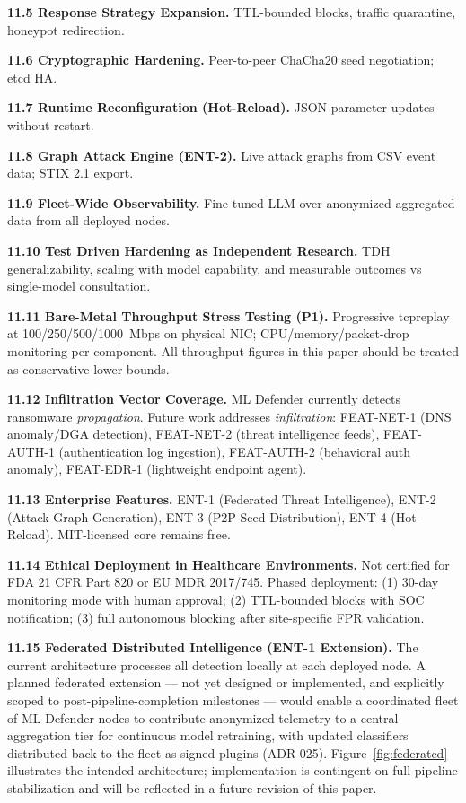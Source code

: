 \documentclass[11pt,a4paper]{article}
\begin{document}
    \textbf{11.5 Response Strategy Expansion.}
    \label{sec:future:response}
    TTL-bounded blocks, traffic quarantine, honeypot redirection.

    \textbf{11.6 Cryptographic Hardening.} Peer-to-peer ChaCha20 seed negotiation; etcd HA.

    \textbf{11.7 Runtime Reconfiguration (Hot-Reload).} JSON parameter updates without restart.

    \textbf{11.8 Graph Attack Engine (ENT-2).} Live attack graphs from CSV event data; STIX 2.1
    export.

    \textbf{11.9 Fleet-Wide Observability.} Fine-tuned LLM over anonymized aggregated data from
    all deployed nodes.

    \textbf{11.10 Test Driven Hardening as Independent Research.} TDH generalizability, scaling
    with model capability, and measurable outcomes vs single-model consultation.

    \textbf{11.11 Bare-Metal Throughput Stress Testing (P1).}
    \label{sec:future:baremetal}
    Progressive tcpreplay at 100/250/500/1000~Mbps on physical NIC; CPU/memory/packet-drop
    monitoring per component. All throughput figures in this paper should be treated as
    conservative lower bounds.

    \textbf{11.12 Infiltration Vector Coverage.}
    ML Defender currently detects ransomware \emph{propagation}. Future work addresses
    \emph{infiltration}: FEAT-NET-1 (DNS anomaly/DGA detection), FEAT-NET-2 (threat intelligence
    feeds), FEAT-AUTH-1 (authentication log ingestion), FEAT-AUTH-2 (behavioral auth anomaly),
    FEAT-EDR-1 (lightweight endpoint agent).

    \textbf{11.13 Enterprise Features.} ENT-1 (Federated Threat Intelligence), ENT-2 (Attack
    Graph Generation), ENT-3 (P2P Seed Distribution), ENT-4 (Hot-Reload). MIT-licensed core
    remains free.

    \textbf{11.14 Ethical Deployment in Healthcare Environments.} Not certified for FDA 21 CFR
    Part 820 or EU MDR 2017/745. Phased deployment: (1) 30-day monitoring mode with human
    approval; (2) TTL-bounded blocks with SOC notification; (3) full autonomous blocking after
    site-specific FPR validation.

    \textbf{11.15 Federated Distributed Intelligence (ENT-1 Extension).}
    \label{sec:future:federated}
    The current architecture processes all detection locally at each deployed node.
    A planned federated extension --- not yet designed or implemented, and explicitly
    scoped to post-pipeline-completion milestones --- would enable a coordinated fleet of
    ML Defender nodes to contribute anonymized telemetry to a central aggregation tier
    for continuous model retraining, with updated classifiers distributed back to the fleet
    as signed plugins (ADR-025). Figure~\ref{fig:federated} illustrates the intended
    architecture; implementation is contingent on full pipeline stabilization and will be
    reflected in a future revision of this paper.
\end{document}
